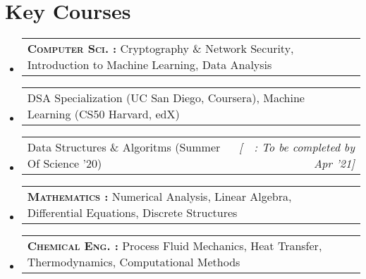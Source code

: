 \documentclass[a4paper,11pt]{article}
\makeatletter
\newcommand{\resumeSubSubheading}[2]{
    \item
    \begin{tabular*}{0.977\textwidth}{l@{\extracolsep{\fill}}r}
      \small#1 & \textit{\small #2} \\
    \end{tabular*}\vspace{-7pt}
}
\newcommand{\resumeSubHeadingListStart}{\begin{itemize}[leftmargin=-0pt, label={}]}
\newcommand{\resumeSubHeadingListEnd}{\end{itemize}}
\makeatother
\begin{document}
  \section{Key Courses}
    \begin{adjustwidth}{10.8pt}{}
    \resumeSubHeadingListStart
      \resumeSubSubheading 
        {\textbf{\textsc{Computer Sci. : }}Cryptography \& Network Security\textsuperscript{\textdagger}, Introduction to Machine Learning\textsuperscript{\textdagger}, Data Analysis\textsuperscript{\textdagger}}{}
        \vspace{-0.35cm}
      \resumeSubSubheading
        {\hspace{3.05cm}DSA Specialization (UC San Diego, Coursera), Machine Learning\textsuperscript{\textdagger} (CS50 Harvard, edX)}{}
        \vspace{-0.35cm}
      \resumeSubSubheading
        {\hspace{3.05cm}Data Structures \& Algoritms (Summer Of Science '20)}{[\ \textdagger\ : To be completed by Apr '21]}
        \vspace{-0.35cm}
      \resumeSubSubheading
        {\textbf{\textsc{Mathematics \hspace{3.5mm}: }}Numerical Analysis, Linear Algebra, Differential Equations, Discrete Structures\textsuperscript{\textdagger}}{}
        \vspace{-0.35cm}
      \resumeSubSubheading
        {\textbf{\textsc{Chemical Eng. : }}Process Fluid Mechanics\textsuperscript{\textdagger}, Heat Transfer\textsuperscript{\textdagger}, Thermodynamics, Computational Methods}{}
        \vspace{-0.3cm}
    \resumeSubHeadingListEnd    
    
    \end{adjustwidth}

\end{document}
